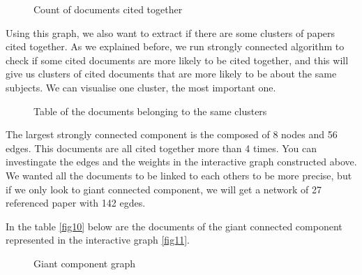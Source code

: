 \documentclass[article,twocolumn]{IEEEtran}
\begin{document}
    \begin{figure}
        \begin{center}\end{center}
        \caption{Count of documents cited together}
        \label{fig8}
    \end{figure}
    
    Using this graph, we also want to extract if there are some clusters of
papers cited together. As we explained before, we run strongly connected
algorithm to check if some cited documents are more likely to be cited
together, and this will give us clusters of cited documents that are
more likely to be about the same subjects. We can visualise one cluster,
the most important one.



    \begin{figure}
        \begin{center}\end{center}
        \caption{Table of the documents belonging to the same clusters}
        \label{fig9}
    \end{figure}
    


    \begin{figure}
        \begin{center}\end{center}
        \caption{}
        \label{}
    \end{figure}
    
    The largest strongly connected component is the composed of 8 nodes and
56 edges. This documents are all cited together more than 4 times. You
can investingate the edges and the weights in the interactive graph
constructed above. We wanted all the documents to be linked to each
others to be more precise, but if we only look to giant connected
component, we will get a network of 27 referenced paper with 142 egdes.


    In the table \ref{fig10} below are the documents of the giant connected
component represented in the interactive graph \ref{fig11}.


    \begin{figure}
        \begin{center}\end{center}
        \caption{Giant component graph}
        \label{fig12}
    \end{figure}
    
\end{document}
